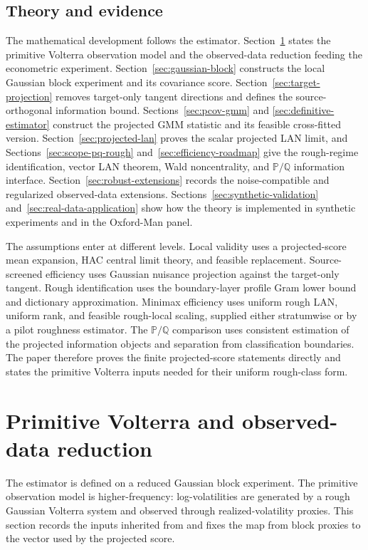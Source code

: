 \documentclass[11pt,a4paper]{amsart}
\theoremstyle{plain}
\theoremstyle{definition}
\theoremstyle{remark}
\newcommand{\PP}{\mathbb{P}}
\newcommand{\QQ}{\mathbb{Q}}
\begin{document}
\subsection*{Theory and evidence}

The mathematical development follows the estimator.  Section~\ref{sec:primitive-reduction} states
the primitive Volterra observation model and the observed-data reduction feeding the econometric
experiment.  Section~\ref{sec:gaussian-block} constructs the local Gaussian block experiment and
its covariance score.  Section~\ref{sec:target-projection} removes target-only tangent directions
and defines the source-orthogonal information bound.  Sections~\ref{sec:pcov-gmm} and
\ref{sec:definitive-estimator} construct the projected GMM statistic and its feasible cross-fitted
version.  Section~\ref{sec:projected-lan} proves the scalar projected LAN limit, and
Sections~\ref{sec:scope-pq-rough} and~\ref{sec:efficiency-roadmap} give the rough-regime
identification, vector LAN theorem, Wald noncentrality, and \(\PP/\QQ\) information interface.
Section~\ref{sec:robust-extensions} records the noise-compatible and regularized observed-data
extensions.  Sections~\ref{sec:synthetic-validation} and~\ref{sec:real-data-application} show how
the theory is implemented in synthetic experiments and in the Oxford-Man panel.

The assumptions enter at different levels.  Local validity uses a projected-score mean expansion,
HAC central limit theory, and feasible replacement.  Source-screened efficiency uses Gaussian
nuisance projection against the target-only tangent.  Rough identification uses the boundary-layer
profile Gram lower bound and dictionary approximation.  Minimax efficiency uses uniform rough LAN,
uniform rank, and feasible rough-local scaling, supplied either stratumwise or by a pilot roughness
estimator.  The \(\PP/\QQ\) comparison uses consistent estimation of the projected information
objects and separation from classification boundaries.  The paper therefore proves the finite
projected-score statements directly and states the primitive Volterra inputs needed for their
uniform rough-class form.

\section{Primitive Volterra and observed-data reduction}\label{sec:primitive-reduction}

The estimator is defined on a reduced Gaussian block experiment.  The primitive observation model is
higher-frequency: log-volatilities are generated by a rough Gaussian Volterra system and observed
through realized-volatility proxies.  This section records the inputs inherited from
\cite{vidal2026latent,vidal2026dynamic} and fixes the map from block proxies to the vector used by
the projected score.
\end{document}
